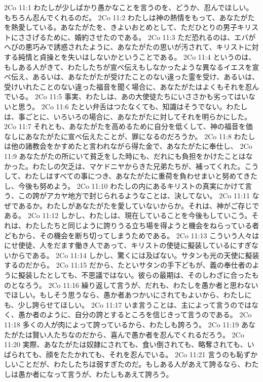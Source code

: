 2Co 11:1  わたしが少しばかり愚かなことを言うのを、どうか、忍んでほしい。もちろん忍んでくれるのだ。
2Co 11:2  わたしは神の熱情をもって、あなたがたを熱愛している。あなたがたを、きよいおとめとして、ただひとりの男子キリストにささげるために、婚約させたのである。
2Co 11:3  ただ恐れるのは、エバがへびの悪巧みで誘惑されたように、あなたがたの思いが汚されて、キリストに対する純情と貞操とを失いはしないかということである。
2Co 11:4  というのは、もしある人がきて、わたしたちが宣べ伝えもしなかったような異なるイエスを宣べ伝え、あるいは、あなたがたが受けたことのない違った霊を受け、あるいは、受けいれたことのない違った福音を聞く場合に、あなたがたはよくもそれを忍んでいる。
2Co 11:5  事実、わたしは、あの大使徒たちにいささかも劣ってはいないと思う。
2Co 11:6  たとい弁舌はつたなくても、知識はそうでない。わたしは、事ごとに、いろいろの場合に、あなたがたに対してそれを明らかにした。
2Co 11:7  それとも、あなたがたを高めるために自分を低くして、神の福音を価なしにあなたがたに宣べ伝えたことが、罪になるのだろうか。
2Co 11:8  わたしは他の諸教会をかすめたと言われながら得た金で、あなたがたに奉仕し、
2Co 11:9  あなたがたの所にいて貧乏をした時にも、だれにも負担をかけたことはなかった。わたしの欠乏は、マケドニヤからきた兄弟たちが、補ってくれた。こうして、わたしはすべての事につき、あなたがたに重荷を負わせまいと努めてきたし、今後も努めよう。
2Co 11:10  わたしの内にあるキリストの真実にかけて言う、この誇がアカヤ地方で封じられるようなことは、決してない。
2Co 11:11  なぜであるか。わたしがあなたがたを愛していないからか。それは、神がご存じである。
2Co 11:12  しかし、わたしは、現在していることを今後もしていこう。それは、わたしたちと同じように誇りうる立ち場を得ようと機会をねらっている者どもから、その機会を断ち切ってしまうためである。
2Co 11:13  こういう人々はにせ使徒、人をだます働き人であって、キリストの使徒に擬装しているにすぎないからである。
2Co 11:14  しかし、驚くには及ばない。サタンも光の天使に擬装するのだから。
2Co 11:15  だから、たといサタンの手下どもが、義の奉仕者のように擬装したとしても、不思議ではない。彼らの最期は、そのしわざに合ったものとなろう。
2Co 11:16  繰り返して言うが、だれも、わたしを愚か者と思わないでほしい。もしそう思うなら、愚か者あつかいにされてもよいから、わたしにも、少し誇らせてほしい。
2Co 11:17  いま言うことは、主によって言うのではなく、愚か者のように、自分の誇とするところを信じきって言うのである。
2Co 11:18  多くの人が肉によって誇っているから、わたしも誇ろう。
2Co 11:19  あなたがたは賢い人たちなのだから、喜んで愚か者を忍んでくれるだろう。
2Co 11:20  実際、あなたがたは奴隷にされても、食い倒されても、略奪されても、いばられても、顔をたたかれても、それを忍んでいる。
2Co 11:21  言うのも恥ずかしいことだが、わたしたちは弱すぎたのだ。もしある人があえて誇るなら、わたしは愚か者になって言うが、わたしもあえて誇ろう。

